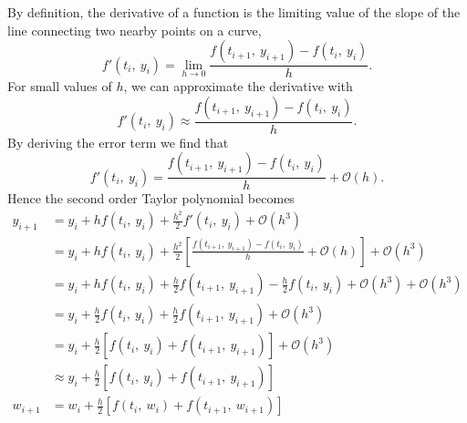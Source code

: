 \documentclass{article}
\begin{document}
By definition, the derivative of a function is the limiting value of the slope of the line connecting
two nearby points on a curve,
\begin{equation*}
    f'\left( t_i,\: y_i \right) = \lim_{h \to 0} \frac{f\left( t_{i + 1},\: y_{i + 1} \right) - f\left( t_i,\: y_i \right)}{h}.
\end{equation*}
For small values of \(h\), we can approximate the derivative with
\begin{equation*}
    f'\left( t_i,\: y_i \right) \approx \frac{f\left( t_{i + 1},\: y_{i + 1} \right) - f\left( t_i,\: y_i \right)}{h}.
\end{equation*}
By deriving the error term we find that
\begin{equation*}
    f'\left( t_i,\: y_i \right) = \frac{f\left( t_{i + 1},\: y_{i + 1} \right) - f\left( t_i,\: y_i \right)}{h} + \mathcal{O}\left( h \right).
\end{equation*}
Hence the second order Taylor polynomial becomes
\begin{align*}
    y_{i + 1} & = y_i + h f\left( t_i,\: y_i \right) + \frac{h^2}{2} f'\left( t_i,\: y_i \right) + \mathcal{O}\left( h^3 \right)                                                                                                \\
              & = y_i + h f\left( t_i,\: y_i \right) + \frac{h^2}{2} \left[ \frac{f\left( t_{i + 1},\: y_{i + 1} \right) - f\left( t_i,\: y_i \right)}{h} + \mathcal{O}\left( h \right) \right] + \mathcal{O}\left( h^3 \right) \\
              & = y_i + h f\left( t_i,\: y_i \right) + \frac{h}{2} f\left( t_{i + 1},\: y_{i + 1} \right) - \frac{h}{2} f\left( t_i,\: y_i \right) + \mathcal{O}\left( h^3 \right) + \mathcal{O}\left( h^3 \right)              \\
              & = y_i + \frac{h}{2} f\left( t_i,\: y_i \right) + \frac{h}{2} f\left( t_{i + 1},\: y_{i + 1} \right) + \mathcal{O}\left( h^3 \right)                                                                             \\
              & = y_i + \frac{h}{2} \left[ f\left( t_i,\: y_i \right) + f\left( t_{i + 1},\: y_{i + 1} \right) \right] + \mathcal{O}\left( h^3 \right)                                                                          \\
              & \approx y_i + \frac{h}{2} \left[ f\left( t_i,\: y_i \right) + f\left( t_{i + 1},\: y_{i + 1} \right) \right]                                                                                                    \\
    w_{i + 1} & = w_i + \frac{h}{2} \left[ f\left( t_i,\: w_i \right) + f\left( t_{i + 1},\: w_{i + 1} \right) \right]
\end{align*}
\end{document}

